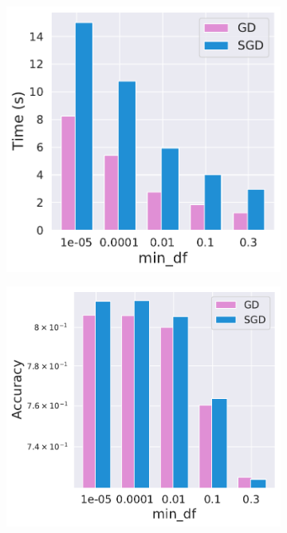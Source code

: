 \begin{enumerate}
	\begin{figure}[h]
        \begin{subfigure}{.5\textwidth}
            \centering
            \includegraphics[width=0.9\linewidth]{./experiment5/mindf_time.pdf}
            \caption{}
        \end{subfigure}%
        \begin{subfigure}{.5\textwidth}
            \centering
            \includegraphics[width=\linewidth]{./experiment5/mindf_acc.pdf}

\end{subfigure}
\end{figure}
\end{enumerate}

